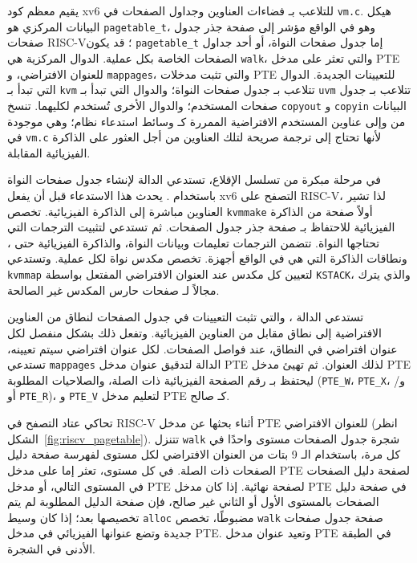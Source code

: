 يقيم معظم كود xv6 للتلاعب بـ فضاءات العناوين وجداول الصفحات في \texttt{vm.c}.
هيكل البيانات المركزي هو \texttt{pagetable\_t}، وهو في الواقع مؤشر إلى صفحة جذر جدول صفحات RISC-V؛
قد يكون \texttt{pagetable\_t} إما جدول صفحات النواة، أو أحد جداول الصفحات الخاصة بكل عملية.
الدوال المركزية هي \texttt{walk}، والتي تعثر على مدخل PTE للعنوان الافتراضي، و \texttt{mappages}، والتي تثبت مدخلات PTE للتعيينات الجديدة.
الدوال التي تبدأ بـ \texttt{kvm} تتلاعب بـ جدول صفحات النواة؛ والدوال التي تبدأ بـ \texttt{uvm} تتلاعب بـ جدول صفحات المستخدم؛ والدوال الأخرى تُستخدم لكليهما.
تنسخ \texttt{copyout} و \texttt{copyin} البيانات من وإلى عناوين المستخدم الافتراضية الممررة كـ وسائط استدعاء نظام؛ وهي موجودة في \texttt{vm.c} لأنها تحتاج إلى ترجمة صريحة لتلك العناوين من أجل العثور على الذاكرة الفيزيائية المقابلة.

في مرحلة مبكرة من تسلسل الإقلاع، تستدعي  الدالة  لإنشاء جدول صفحات النواة باستخدام .
يحدث هذا الاستدعاء قبل أن يفعل xv6 التصفح على RISC-V، لذا تشير العناوين مباشرة إلى الذاكرة الفيزيائية.
تخصص \lstinline{kvmmake} أولاً صفحة من الذاكرة الفيزيائية للاحتفاظ بـ صفحة جذر جدول الصفحات.
ثم تستدعي  لتثبيت الترجمات التي تحتاجها النواة.
تتضمن الترجمات تعليمات وبيانات النواة، والذاكرة الفيزيائية حتى ، ونطاقات الذاكرة التي هي في الواقع أجهزة.
تخصص  مكدس نواة لكل عملية. وتستدعي \lstinline{kvmmap} لتعيين كل مكدس عند العنوان الافتراضي المفتعل بواسطة \lstinline{KSTACK}، والذي يترك مجالاً لـ صفحات حارس المكدس غير الصالحة.

تستدعي  الدالة ، والتي تثبت التعيينات في جدول الصفحات لنطاق من العناوين الافتراضية إلى نطاق مقابل من العناوين الفيزيائية.
وتفعل ذلك بشكل منفصل لكل عنوان افتراضي في النطاق، عند فواصل الصفحات.
لكل عنوان افتراضي سيتم تعيينه، تستدعي \lstinline{mappages} الدالة  لتدقيق عنوان مدخل PTE لذلك العنوان.
ثم تهيئ مدخل PTE ليحتفظ بـ رقم الصفحة الفيزيائية ذات الصلة، والصلاحيات المطلوبة (\lstinline{PTE_W}، \lstinline{PTE_X}، و/أو \lstinline{PTE_R})، و \lstinline{PTE_V} لتعليم مدخل PTE كـ صالح.

تحاكي  عتاد التصفح في RISC-V أثناء بحثها عن مدخل PTE للعنوان الافتراضي (انظر الشكل~\ref{fig:riscv_pagetable}).
تتنزل \lstinline{walk} شجرة جدول الصفحات مستوى واحدًا في كل مرة، باستخدام الـ 9 بتات من العنوان الافتراضي لكل مستوى لفهرسة صفحة دليل الصفحات ذات الصلة.
في كل مستوى، تعثر إما على مدخل PTE لصفحة دليل الصفحات في المستوى التالي، أو مدخل PTE لصفحة نهائية.
إذا كان مدخل PTE في صفحة دليل الصفحات بالمستوى الأول أو الثاني غير صالح، فإن صفحة الدليل المطلوبة لم يتم تخصيصها بعد؛
إذا كان وسيط \lstinline{alloc} مضبوطًا، تخصص \lstinline{walk} صفحة جدول صفحات جديدة وتضع عنوانها الفيزيائي في مدخل PTE.
وتعيد عنوان مدخل PTE في الطبقة الأدنى في الشجرة.

